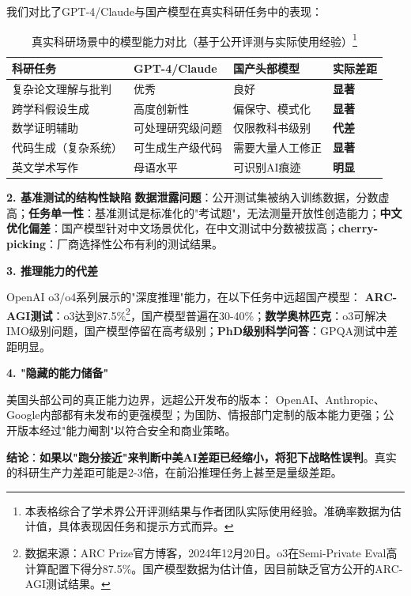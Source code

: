我们对比了GPT-4/Claude与国产模型在真实科研任务中的表现：

\begin{table}[H]
\centering
\caption{真实科研场景中的模型能力对比（基于公开评测与实际使用经验）\protect\footnote{本表格综合了学术界公开评测结果与作者团队实际使用经验。准确率数据为估计值，具体表现因任务和提示方式而异。}}
\small
\begin{tabular}{p{3.5cm}p{3cm}p{3cm}p{3cm}}
\toprule
\textbf{科研任务} & \textbf{GPT-4/Claude} & \textbf{国产头部模型} & \textbf{实际差距} \\
\midrule
复杂论文理解与批判 & 优秀 & 良好 & \textbf{显著} \\
跨学科假设生成 & 高度创新性 & 偏保守、模式化 & \textbf{显著} \\
数学证明辅助 & 可处理研究级问题 & 仅限教科书级别 & \textbf{代差} \\
代码生成（复杂系统） & 可生成生产级代码 & 需要大量人工修正 & \textbf{显著} \\
英文学术写作 & 母语水平 & 可识别AI痕迹 & \textbf{明显} \\
\bottomrule
\end{tabular}
\end{table}

\textbf{2. 基准测试的结构性缺陷}
\textbf{数据泄露问题}：公开测试集被纳入训练数据，分数虚高；\textbf{任务单一性}：基准测试是标准化的"考试题"，无法测量开放性创造能力；\textbf{中文优化偏差}：国产模型针对中文场景优化，在中文测试中分数被拔高；\textbf{cherry-picking}：厂商选择性公布有利的测试结果。

\textbf{3. 推理能力的代差}

OpenAI o3/o4系列展示的"深度推理"能力，在以下任务中远超国产模型：
\textbf{ARC-AGI测试}：o3达到87.5\%\footnote{数据来源：ARC Prize官方博客，2024年12月20日。o3在Semi-Private Eval高计算配置下得分87.5\%。国产模型数据为估计值，因目前缺乏官方公开的ARC-AGI测试结果。}，国产模型普遍在30-40\%；\textbf{数学奥林匹克}：o3可解决IMO级别问题，国产模型停留在高考级别；\textbf{PhD级别科学问答}：GPQA测试中差距明显。

\textbf{4. "隐藏的能力储备"}

美国头部公司的真正能力边界，远超公开发布的版本：
OpenAI、Anthropic、Google内部都有未发布的更强模型；为国防、情报部门定制的版本能力更强；公开版本经过"能力阉割"以符合安全和商业策略。

\textbf{结论}：\textbf{如果以"跑分接近"来判断中美AI差距已经缩小，将犯下战略性误判}。真实的科研生产力差距可能是2-3倍，在前沿推理任务上甚至是量级差距。

